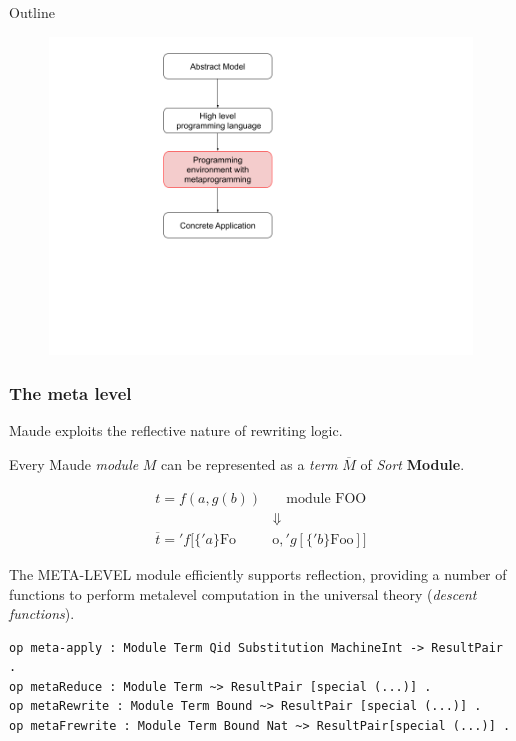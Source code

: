 \documentclass{beamer}
\begin{document}
\begin{frame}{Outline}
    \begin{figure}
        \includegraphics[height=\textheight]{img/sec3.png}
    \end{figure}
\end{frame}
\begin{frame}[fragile]
    \scriptsize
    \frametitle{The meta level }
    Maude exploits the reflective nature of rewriting logic. 
    
    \bigskip
    Every Maude \emph{module} \textbf{$M$} can be represented  as 
    a \emph{term} \textbf{$\overline{M}$} of \emph{Sort} \textbf{Module}. 

    \begin{align*}
        t=f(a,g(b))& \quad  \text{module FOO}\\
            &\Downarrow \\ 
        \overline{t}='f[\{'a\}\text{Fo}&\text{o},'g[\{'b\}\text{Foo}]]
    \end{align*}

    \bigskip
    The META-LEVEL module efficiently supports reflection, providing a number of functions to 
    perform metalevel computation in the universal theory (\emph{descent functions}).
    \begin{lstlisting}[language=maude]
op meta-apply : Module Term Qid Substitution MachineInt -> ResultPair .
op metaReduce : Module Term ~> ResultPair [special (...)] .
op metaRewrite : Module Term Bound ~> ResultPair [special (...)] .
op metaFrewrite : Module Term Bound Nat ~> ResultPair[special (...)] .    
\end{lstlisting}


\end{frame}
\end{document}
